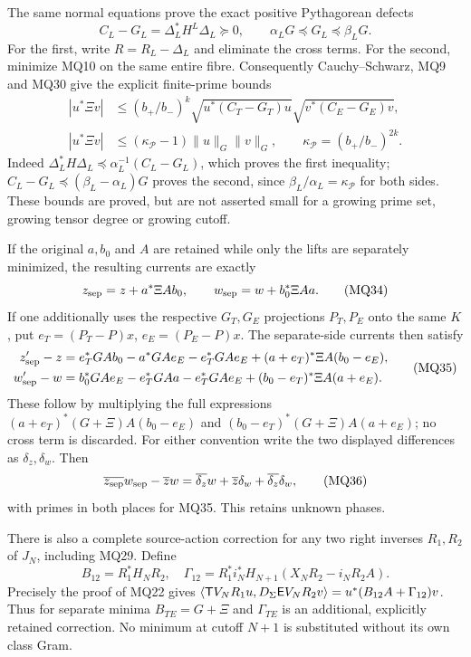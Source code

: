 \documentclass[11pt]{article}
\begin{document}
The same normal equations prove the exact positive Pythagorean
defects
\[
 C_L-G_L=\Delta_L^*H^L\Delta_L\succeq0,
 \qquad \alpha_LG\preceq G_L\preceq\beta_LG.                \tag{MQ32}
\]
For the first, write $R=R_L-\Delta_L$ and eliminate the cross
terms. For the second, minimize MQ10 on the same entire fibre.
Consequently Cauchy--Schwarz, MQ9 and MQ30 give the explicit
finite-prime bounds
\[
 \begin{split}
 |u^*\Xi v|&\le (b_+/b_-)^k
  \sqrt{u^*(C_T-G_T)u}\sqrt{v^*(C_E-G_E)v},\\
 |u^*\Xi v|&\le(\kappa_{\mathcal P}-1)\|u\|_G\|v\|_G,
 \qquad \kappa_{\mathcal P}=(b_+/b_-)^{2k}.
 \end{split}                                                \tag{MQ33}
\]
Indeed $\Delta_L^*H\Delta_L\preceq
\alpha_L^{-1}(C_L-G_L)$, which proves the first inequality;
$C_L-G_L\preceq(\beta_L-\alpha_L)G$ proves the second, since
$\beta_L/\alpha_L=\kappa_{\mathcal P}$ for both sides. These
bounds are proved, but are not asserted small for a growing prime
set, growing tensor degree or growing cutoff.

If the original $a,b_0$ and $A$ are retained while only the lifts
are separately minimized, the resulting currents are exactly
\[
 z_{\rm sep}=z+a^*\Xi A b_0,\qquad
 w_{\rm sep}=w+b_0^*\Xi A a.                               \tag{MQ34}
\]
If one additionally uses the respective $G_T,G_E$ projections
$P_T,P_E$ onto the same $K$, put $e_T=(P_T-P)x$,
$e_E=(P_E-P)x$. The separate-side currents then satisfy
\[
 \begin{split}
 z_{\rm sep}'-z={}&e_T^*GA b_0-a^*GAe_E-e_T^*GAe_E
       +(a+e_T)^*\Xi A(b_0-e_E),\\
 w_{\rm sep}'-w={}&b_0^*GAe_E-e_T^*GAa-e_T^*GAe_E
       +(b_0-e_T)^*\Xi A(a+e_E).
 \end{split}                                                 \tag{MQ35}
\]
These follow by multiplying the full expressions
$(a+e_T)^*(G+\Xi)A(b_0-e_E)$ and
$(b_0-e_T)^*(G+\Xi)A(a+e_E)$; no cross term is discarded.
For either convention write the two displayed differences as
$\delta_z,\delta_w$. Then
\[
 \overline{z_{\rm sep}}w_{\rm sep}-\overline zw
   =\overline{\delta_z}w+\overline z\delta_w
     +\overline{\delta_z}\delta_w,                          \tag{MQ36}
\]
with primes in both places for MQ35. This retains unknown phases.

There is also a complete source-action correction for any two
right inverses $R_1,R_2$ of $J_N$, including MQ29. Define
\[
 B_{12}=R_1^*H_NR_2,\quad
 \Gamma_{12}=R_1^*i_N^*H_{N+1}(X_NR_2-i_NR_2A).
                                                               \tag{MQ37}
\]
Precisely the proof of MQ22 gives
$\langle\mathsf T V_NR_1u,D_\Sigma\mathsf E V_NR_2v\rangle
=u^*(B_{12}A+\Gamma_{12})v$.
Thus for separate minima $B_{TE}=G+\Xi$ and $\Gamma_{TE}$ is
an additional, explicitly retained correction. No minimum at cutoff
$N+1$ is substituted without its own class Gram.
\end{document}
